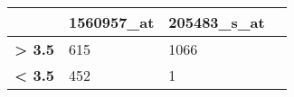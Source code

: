 \begin{tabular}{|l|l|l|l|}
\toprule
 & \bfseries 1560957\_at & \bfseries 205483\_s\_at \\
\midrule
\bfseries > 3.5 & 615 & 1066 \\
\bfseries < 3.5 & 452 & 1 \\
\bottomrule
\end{tabular}
